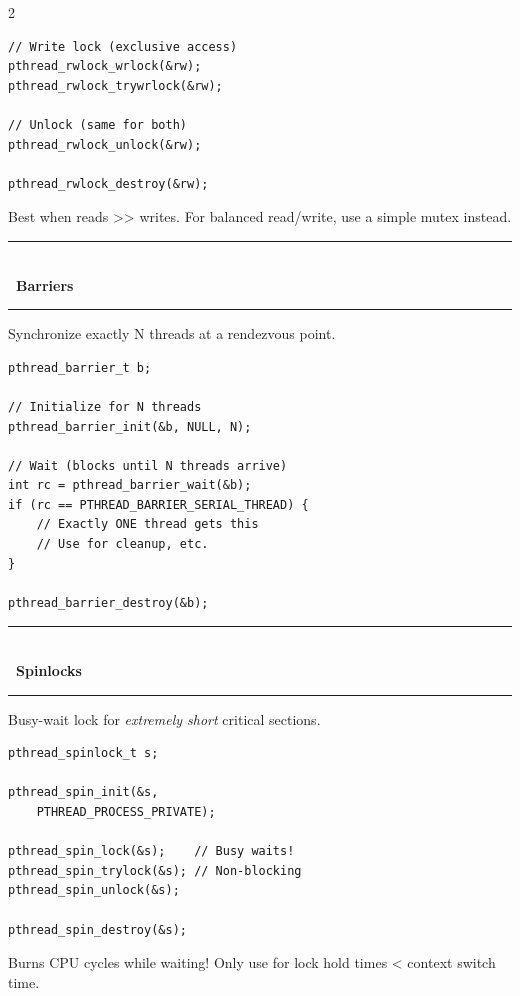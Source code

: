 \documentclass[11pt,a4paper]{article}
\newcommand{\styledSection}[2]{%
    \vspace{8pt}%
    \noindent\textcolor{primaryblue}{\rule{\linewidth}{1.5pt}}\\[-8pt]
    {\fontsize{14pt}{16pt}\selectfont\bfseries\color{primaryblue}#1\ #2}\\[-4pt]
    \textcolor{primaryblue!50}{\rule{\linewidth}{0.8pt}}%
    \vspace{4pt}%
}
\begin{document}
\begin{multicols}{2}
\begin{lstlisting}
// Write lock (exclusive access)
pthread_rwlock_wrlock(&rw);
pthread_rwlock_trywrlock(&rw);

// Unlock (same for both)
pthread_rwlock_unlock(&rw);

pthread_rwlock_destroy(&rw);
\end{lstlisting}

\begin{tipbox}
\fontsize{9pt}{11pt}\selectfont
\textcolor{textlight}{Best when reads >> writes. For balanced read/write, use a simple mutex instead.}
\end{tipbox}

\styledSection{\faUsers}{Barriers}

\textcolor{textmuted}{\footnotesize Synchronize exactly N threads at a rendezvous point.}

\begin{lstlisting}
pthread_barrier_t b;

// Initialize for N threads
pthread_barrier_init(&b, NULL, N);

// Wait (blocks until N threads arrive)
int rc = pthread_barrier_wait(&b);
if (rc == PTHREAD_BARRIER_SERIAL_THREAD) {
    // Exactly ONE thread gets this
    // Use for cleanup, etc.
}

pthread_barrier_destroy(&b);
\end{lstlisting}

\styledSection{\faSync}{Spinlocks}

\textcolor{textmuted}{\footnotesize Busy-wait lock for \textit{extremely short} critical sections.}

\begin{lstlisting}
pthread_spinlock_t s;

pthread_spin_init(&s, 
    PTHREAD_PROCESS_PRIVATE);

pthread_spin_lock(&s);    // Busy waits!
pthread_spin_trylock(&s); // Non-blocking
pthread_spin_unlock(&s);

pthread_spin_destroy(&s);
\end{lstlisting}

\begin{warnbox}
\fontsize{9pt}{11pt}\selectfont
\textcolor{textlight}{Burns CPU cycles while waiting! Only use for lock hold times < context switch time.}
\end{warnbox}


\end{multicols}
\end{document}
